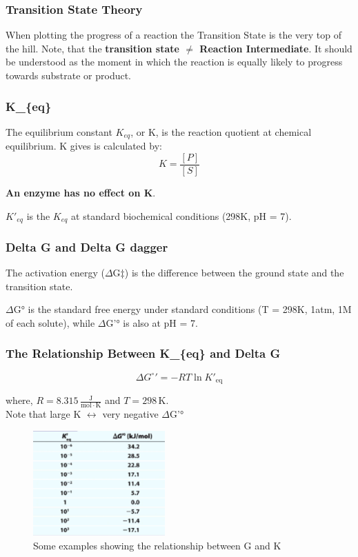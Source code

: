 \documentclass[../main.tex]{subfiles}
\begin{document}
\subsubsection{\gls{Transition State Theory}}
When plotting the progress of a reaction the \gls{Transition State} is the very top of the hill. Note, that the \textbf{transition state $\neq$ \gls{Reaction Intermediate}}. It should be understood as the moment in which the reaction is equally likely to progress towards substrate or product.




\subsubsection{\gls{K_{eq}}}
The equilibrium constant $K_{eq}$, or K, is the reaction quotient at chemical equilibrium. K gives is calculated by:
\begin{equation}
	K = \frac{[P]}{[S]}
\end{equation}

\noindent\textbf{An enzyme has no effect on K}.

$K'_{eq}$ is the $K_{eq}$ at standard biochemical conditions (298K, pH = 7).


\subsubsection{\gls{Delta G} and \gls{Delta G dagger}}

The activation energy ($\Delta$G$\ddagger$) is the difference between the ground state and the transition state.

$\Delta$G° is the standard free energy under standard conditions (T = 298K, 1atm, 1M of each solute), while $\Delta$G'° is also at pH = 7.
\subsubsection{The Relationship Between \gls{K_{eq}} and \gls{Delta G}}
\begin{equation}
	\Delta G^\circ{}' = -RT \ln K'_{\mathrm{eq}}
\end{equation}

where, \( R = 8.315\, \frac{\mathrm{J}}{\mathrm{mol \cdot K}} \) and \( T = 298\, \mathrm{K} \). \\

Note that large K $\leftrightarrow$ very negative $\Delta$G'°

\begin{figure}[h]
	\centering
	\includegraphics[width=0.45\textwidth]{G_and_K}
	\caption{Some examples showing the relationship between G and K}
\end{figure}
\end{document}
